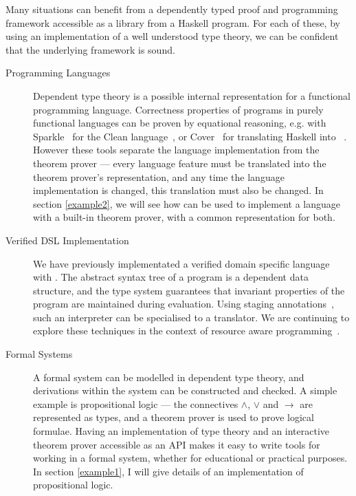 Many situations can benefit from a dependently typed proof and
programming framework accessible as a library from a Haskell program.
For each of these, by using an implementation of a well understood
type theory, we can be confident that the underlying framework is
sound. 


\begin{description}
\item[Programming Languages] 
Dependent type theory is a possible internal representation for a
functional programming language. 
Correctness
properties of programs in purely functional languages can be proven by
equational reasoning, 
e.g. with Sparkle~\cite{sparkle} for the Clean language~\cite{clean}, or
Cover~\cite{cover} for translating Haskell into
\Agda{}~\cite{agda}. However these tools 
separate the language implementation from the theorem prover --- every
language feature must be translated into the theorem prover's
representation, and any time the language implementation is changed,
this translation must also be changed.
In section
\ref{example2}, we will see how \Ivor{} can be used to implement a
language with a built-in theorem prover, with a common representation
for both.

\item[Verified DSL Implementation] 

We have previously implementated a verified domain specific
language~\cite{dtpmsp-gpce} with \Ivor{}.  The abstract syntax tree of
a program is a dependent data structure, and the type system
guarantees that invariant properties of the program are maintained
during evaluation.  Using staging annotations~\cite{multi-taha}, such
an interpreter can be specialised to a translator. We are continuing
to explore these techniques in the context of resource aware
programming~\cite{dt-framework}.

\item[Formal Systems] 

A formal system can be modelled in dependent type theory, and
derivations within the system can be constructed and checked. 
A simple example is propositional logic --- the connectives
$\land$, $\lor$ and $\to$ are represented as types, and a theorem
prover is used to prove logical formulae.  Having an implementation of
type theory and an interactive theorem prover accessible as an API
makes it easy to write tools for working in a formal system, whether
for educational or practical purposes.  In section \ref{example1}, I
will give details of an implementation of propositional logic.

\end{description}

